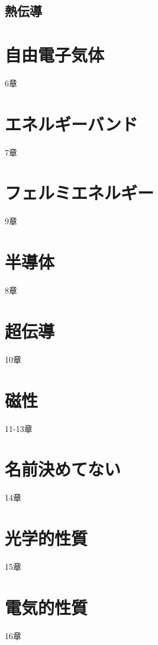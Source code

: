 \documentclass[a4paper]{jsreport}
\begin{document}
        \section{熱伝導}
        
    \chapter{自由電子気体}
        6章
    \chapter{エネルギーバンド}
        7章
    \chapter{フェルミエネルギー}
        9章
    \chapter{半導体}
        8章
    \chapter{超伝導}
        10章
    \chapter{磁性}
        11-13章
    \chapter{名前決めてない}
        14章
    \chapter{光学的性質}
        15章
    \chapter{電気的性質}
        16章
    
            
\end{document}

